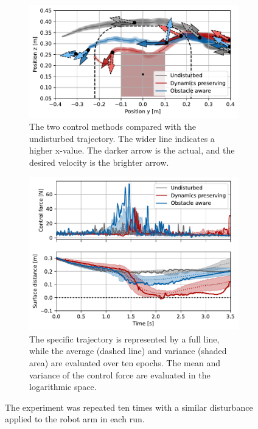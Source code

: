 \begin{figure}[htbp]
    \begin{subfigure}{\columnwidth}
      \centerline{\includegraphics[width=\textwidth]{figures/robot_arm_trajectory_xyz}}
      \caption{The two control methods compared with the undisturbed trajectory. The wider line indicates a higher x-value. The darker arrow is the actual, and the desired velocity is the brighter arrow.}
      \label{fig:robot_arm_trajectory_xyz}
    \end{subfigure}
    \begin{subfigure}{\columnwidth}
		\includegraphics[width=\textwidth]{figures/trajectory_comparison_force_and_distance}
      \caption{The specific trajectory is represented by a full line, while the average (dashed line) and variance (shaded area) are evaluated over ten epochs. The mean and variance of the control force are evaluated in the logarithmic space.}
      \label{fig:trajectory_comparison_force_and_distance}
    \end{subfigure}
	\caption{
 The experiment was repeated ten times with a similar disturbance applied to the robot arm in each run.
 }  
    \label{fig:evaluation_on_robot_arm}
\end{figure}
